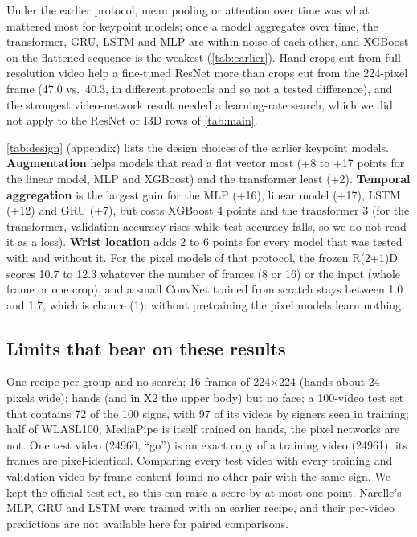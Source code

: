 \documentclass{article}
\begin{document}
Under the earlier protocol, mean pooling or attention over time was what mattered most for keypoint models; once a
model aggregates over time, the transformer, GRU, LSTM and MLP are within noise of each other, and XGBoost on the
flattened sequence is the weakest (\cref{tab:earlier}). Hand crops cut from full-resolution video help a fine-tuned
ResNet more than crops cut from the 224-pixel frame (47.0 vs.\ 40.3, in different protocols and so not a tested
difference), and the strongest video-network result needed a learning-rate search, which we did not apply to the
ResNet or I3D rows of \cref{tab:main}.

\cref{tab:design} (appendix) lists the design choices of the earlier keypoint models. \textbf{Augmentation} helps models
that read a flat vector most (+8 to +17 points for the linear model, MLP and XGBoost) and the transformer least (+2).
\textbf{Temporal aggregation} is the largest gain for the MLP (+16), linear model (+17), LSTM (+12) and GRU (+7), but costs
XGBoost 4 points and the transformer 3 (for the transformer, validation accuracy rises while test accuracy falls, so we do
not read it as a loss).
\textbf{Wrist location} adds 2 to 6 points for every model that was tested with and without it. For the pixel models of
that protocol, the frozen R(2+1)D scores 10.7 to 12.3 whatever the number of frames (8 or 16) or the input (whole frame
or one crop), and a small ConvNet trained from scratch stays between 1.0 and 1.7, which is chance (1): without pretraining the
pixel models learn nothing.

\subsection{Limits that bear on these results}\label{sec:limits}
One recipe per group and no search; 16 frames of 224$\times$224 (hands about 24 pixels wide); hands (and in X2
the upper body) but no face; a 100-video test set that contains 72 of the 100 signs, with 97 of its videos by signers
seen in training; half of WLASL100; MediaPipe is itself trained on hands, the pixel networks are not. One test video (24960, ``go'') is an exact copy of a training video (24961): its frames are pixel-identical. Comparing every
test video with every training and validation video by frame content found no other pair with the same sign. We kept the
official test set, so this can raise a score by at most one point. Narelle's MLP, GRU and LSTM were trained with an
earlier recipe, and their per-video predictions are not available here for paired comparisons.
\end{document}
